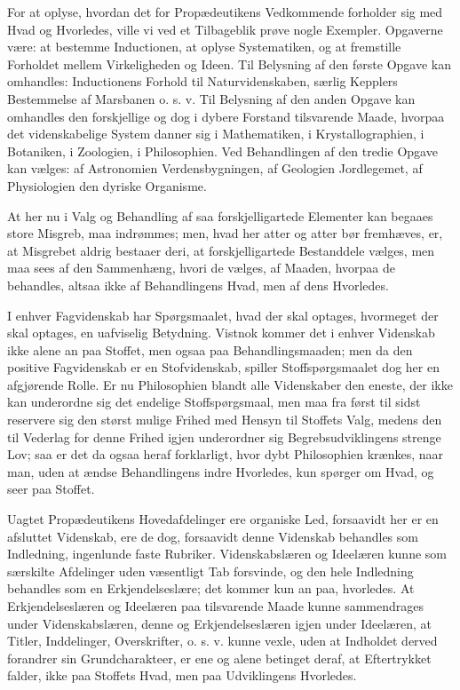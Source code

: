 \documentclass[12pt]{book}
\newcommand{\opage}[1]{\marginnote{\footnotesize\textit{[#1]}}}
\begin{document}
For at oplyse, hvordan det for Propædeutikens Vedkommende forholder sig med Hvad og Hvorledes, ville
vi ved et Tilbageblik prøve nogle Exempler. Opgaverne være: at bestemme Inductionen, at oplyse
Systematiken, og at fremstille Forholdet mellem Virkeligheden og Ideen. Til Belysning af den første
Opgave kan omhandles: Inductionens Forhold til Naturvidenskaben, særlig Kepplers Bestemmelse af
Marsbanen o. s. v. Til Belysning af den anden Opgave kan omhandles den forskjellige og dog i dybere
Forstand tilsvarende Maade, hvorpaa det videnskabelige System danner sig i Mathematiken, i
Krystallographien, i Botaniken, i Zoologien, i Philosophien. Ved Behandlingen af den tredie Opgave kan
vælges: af Astronomien Verdensbygningen, af Geologien Jordlegemet, af Physiologien den dyriske
Organisme.

At her nu i Valg og Behandling af saa forskjelligartede Elementer kan begaaes store Misgreb, maa
indrømmes; men, hvad her atter og atter bør fremhæves, er, at Misgrebet aldrig bestaaer deri, at
forskjelligartede Bestanddele vælges, men maa sees af den Sammenhæng, hvori de vælges, af Maaden,
hvorpaa de behandles, altsaa ikke af Behandlingens Hvad, men af dens Hvorledes.

I enhver Fagvidenskab har Spørgsmaalet, hvad der skal optages, hvormeget der skal optages, en
uafviselig Betydning. Vistnok kommer det i enhver Videnskab ikke alene an paa Stoffet, men ogsaa paa
Behandlingsmaaden; men da den positive Fagvidenskab er en Stofvidenskab, spiller
\opage{201} Stoffspørgsmaalet dog her en afgjørende Rolle. Er nu Philosophien blandt alle Videnskaber den eneste,
der ikke kan underordne sig det endelige Stoffspørgsmaal, men maa fra først til sidst reservere sig
den størst mulige Frihed med Hensyn til Stoffets Valg, medens den til Vederlag for denne Frihed igjen
underordner sig Begrebsudviklingens strenge Lov; saa er det da ogsaa heraf forklarligt, hvor dybt
Philosophien krænkes, naar man, uden at ændse Behandlingens indre Hvorledes, kun spørger om Hvad, og
seer paa Stoffet.

Uagtet Propædeutikens Hovedafdelinger ere organiske Led, forsaavidt her er en afsluttet Videnskab, ere
de dog, forsaavidt denne Videnskab behandles som Indledning, ingenlunde faste Rubriker.
Videnskabslæren og Ideelæren kunne som særskilte Afdelinger uden væsentligt Tab forsvinde, og den hele
Indledning behandles som en Erkjendelseslære; det kommer kun an paa, hvorledes. At Erkjendelseslæren og
Ideelæren paa tilsvarende Maade kunne sammendrages under Videnskabslæren, denne og Erkjendelseslæren
igjen under Ideelæren, at Titler, Inddelinger, Overskrifter, o. s. v. kunne vexle, uden at Indholdet
derved forandrer sin Grundcharakteer, er ene og alene betinget deraf, at Eftertrykket falder, ikke paa
Stoffets Hvad, men paa Udviklingens Hvorledes.
\end{document}
